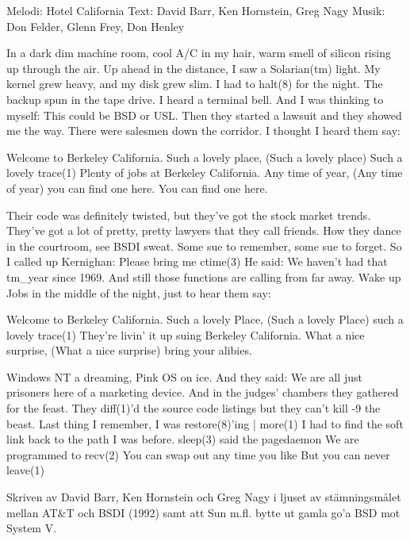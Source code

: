 \begin{song}

\begin{songmeta}
Melodi: Hotel California
Text: David Barr, Ken Hornstein, Greg Nagy
Musik: Don Felder, Glenn Frey, Don Henley
\end{songmeta}

\begin{songtext}
In a dark dim machine room,
cool A/C in my hair,
warm smell of silicon
rising up through the air.
Up ahead in the distance,
I saw a Solarian(tm) light.
My kernel grew heavy, and my disk grew slim.
I had to halt(8) for the night.
The backup spun in the tape drive.
I heard a terminal bell.
And I was thinking to myself:
This could be BSD or USL.
Then they started a lawsuit
and they showed me the way.
There were salesmen down the corridor.
I thought I heard them say:

Welcome to Berkeley California.
Such a lovely place, (Such a lovely place)
Such a lovely trace(1)
Plenty of jobs at Berkeley California.
Any time of year, (Any time of year)
you can find one here.
You can find one here.

Their code was definitely twisted,
but they've got the stock market trends.
They've got a lot of pretty, pretty lawyers
that they call friends.
How they dance in the courtroom,
see BSDI sweat.
Some sue to remember,
some sue to forget.
So I called up Kernighan:
Please bring me ctime(3)
He said:
We haven't had that tm_year since 1969.
And still those functions are calling from far away.
Wake up Jobs in the middle of the night,
just to hear them say:

Welcome to Berkeley California.
Such a lovely Place,
(Such a lovely Place)
such a lovely trace(1)
They're livin' it up suing Berkeley California.
What a nice surprise,
(What a nice surprise)
bring your alibies.

\newpage
Windows NT a dreaming,
Pink OS on ice.
And they said:
We are all just prisoners here
of a marketing device.
And in the judges' chambers
they gathered for the feast.
They diff(1)'d the source code listings
but they can't kill -9 the beast.
Last thing I remember,
I was restore(8)'ing | more(1)
I had to find the soft link back
to the path I was before.
sleep(3) said the pagedaemon
We are programmed to recv(2)
You can swap out any time you like
But you can never leave(1)
\end{songtext}

\begin{songnotes}
Skriven av David Barr, Ken Hornstein och Greg Nagy i ljuset av stämningsmålet
mellan AT\&T och BSDI (1992) samt att Sun m.fl. bytte ut gamla go'a BSD mot System V.
\end{songnotes}
\end{song}

